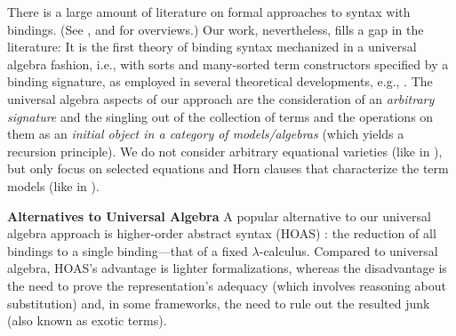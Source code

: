 \documentclass{llncs}
\begin{document}
There is a large amount of literature on formal approaches to syntax with bindings. 
(See \cite[\S2]{POPLmark}, \cite[\S6]{momFelty-Hybrid4}  and \cite[\S2.10,\S3.7]{pop-thesis} for overviews.)  
%
Our work, nevertheless, fills a gap in the literature: 
It is the first theory of binding syntax mechanized in 
a universal algebra fashion, i.e., with sorts and many-sorted term constructors specified 
by a binding signature,  
as employed in several theoretical developments, e.g., \cite{fio-abs,pitts-AlphaStructural,sun-alg,DBLP:journals/tcs/0001R15}.  
The universal algebra aspects 
of our approach are the consideration of an {\em arbitrary signature} and the singling out of 
the collection of terms and the operations on them 
as an {\em initial object in a category of models/algebras} (which yields a recursion principle). 
We do not consider arbitrary equational varieties (like in \cite{sun-alg}), 
but only focus on selected equations and Horn clauses that characterize the term 
models (like in \cite{pitts-AlphaStructural}). 

{\bf Alternatives to Universal Algebra}  
A popular alternative to our universal algebra approach is higher-order abstract syntax (HOAS) 
\cite{har-fra,weakHOAS,momFelty-Hybrid4,chlipala-Parametric,gun-proper}: 
the reduction of all 
bindings to a single binding---that of a fixed $\lambda$-calculus. 
Compared to universal algebra, HOAS's %
advantage is lighter formalizations, 
whereas the disadvantage is the need to prove the representation's adequacy (which 
involves reasoning about substitution) and, in some frameworks, 
the need to rule out the resulted junk (also known as exotic terms).  
\end{document}

